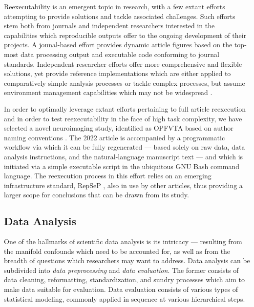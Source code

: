 Reexecutability is an emergent topic in research, with a few extant efforts attempting to provide solutions and tackle associated challenges.
Such efforts stem both from journals and independent researchers interested in the capabilities which reproducible outputs offer to the ongoing development of their projects.
A jounal-based effort \cite{eliferep} provides dynamic article figures based on the top-most data processing output and executable code conforming to journal standards.
Independent researcher efforts offer more comprehensive and flexible solutions, yet provide reference implementations which are either applied to comparatively simple analysis processes \cite{Dar2019} or tackle complex processes, but assume environment management capabilities which may not be widespread \cite{repsep}.

In order to optimally leverage extant efforts pertaining to full article reexecution and in order to test reexecutability in the face of high task complexity, we have selected a novel neuroimaging study, identified as OPFVTA based on author naming conventions \cite{opfvta}.
The 2022 article is accompanied by a programmatic workflow via which it can be fully regenerated — based solely on raw data, data analysis instructions, and the natural-language manuscript text — and which is initiated via a simple executable script in the ubiquitous GNU Bash \cite{bash} command language.
The reexecution process in this effort relies on an emerging infrastructure standard, RepSeP \cite{repsep}, also in use by other articles, thus providing a larger scope for conclusions that can be drawn from its study.


\subsection{Data Analysis}

One of the hallmarks of scientific data analysis is its intricacy — resulting from the manifold confounds which need to be accounted for, as well as from the breadth of questions which researchers may want to address.
Data analysis can be subdivided into \emph{data preprocessing} and \emph{data evaluation}.
The former consists of data cleaning, reformatting, standardization, and sundry processes which aim to make data suitable for evaluation.
Data evaluation consists of various types of statistical modeling, commonly applied in sequence at various hierarchical steps.

